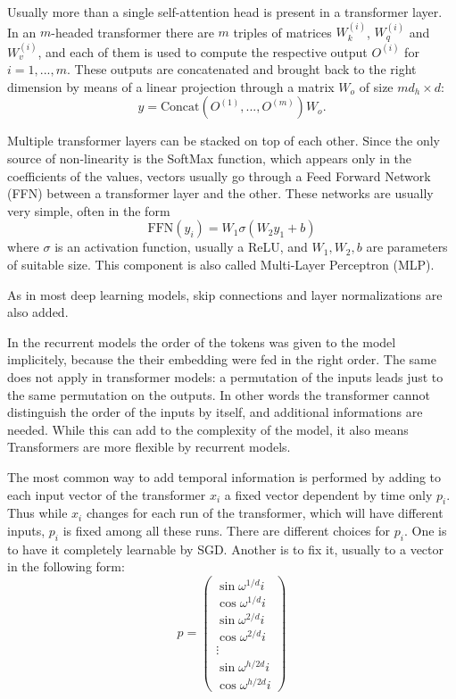 \documentclass[]{marticle}
\begin{document}
Usually more than a single self-attention head is present in a transformer layer. In an
$m$-headed transformer there are $m$ triples of matrices $W_k^{(i)}$, $W_q^{(i)}$ and $W_v^{(i)}$,
and each of them is used to compute the respective output $O^{(i)}$ for $i=1,..., m$. These outputs
are concatenated and brought back to the right dimension by means of a linear projection through a
matrix $W_o$ of size $m d_h\times d$:
$$ y = \text{Concat}(O^{(1)},..., O^{(m)}) W_o. $$

Multiple transformer layers can be stacked on top of each other. Since the only source of
non-linearity is the SoftMax function, which appears only in the coefficients of the values, vectors
usually go through a Feed Forward Network (FFN) between a transformer layer and the other. These
networks are usually very simple, often in the form
$$ \text{FFN}(y_i) = W_1 \sigma(W_2 y_1 + b) $$
where $\sigma$ is an activation function, usually a ReLU, and $W_1, W_2, b$ are parameters of
suitable size. This component is also called Multi-Layer Perceptron (MLP).

As in most deep learning models, skip connections and layer normalizations are also added.

In the recurrent models the order of the tokens was given to the model implicitely, because the
their embedding were fed in the right order. The same does not apply in transformer models: a
permutation of the inputs leads just to the same permutation on the outputs. In other words the
transformer cannot distinguish the order of the inputs by itself, and additional informations are
needed. While this can add to the complexity of the model, it also means Transformers are more
flexible by recurrent models.

The most common way to add temporal information is performed by adding to each input vector of the
transformer $x_i$ a fixed vector dependent by time only $p_i$. Thus while $x_i$ changes for each run
of the transformer, which will have different inputs, $p_i$ is fixed among all these runs. There are
different choices for $p_i$. One is to have it completely learnable by SGD. Another is to fix it,
usually to a vector in the following form:
$$ p = \begin{pmatrix}
\sin\omega^{1/d} i \\
\cos\omega^{1/d} i \\
\sin\omega^{2/d} i \\
\cos\omega^{2/d} i \\
\vdots \\
\sin\omega^{h/2d} i \\
\cos\omega^{h/2d} i
\end{pmatrix}
$$
\end{document}
